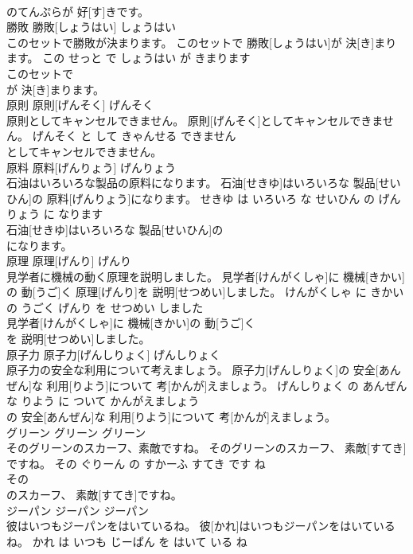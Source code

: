 \documentclass[8pt]{extreport}
\begin{document}
\begin{CJK}{UTF8}{min}
\\	のてんぷらが 好[す]きです。			
\\	勝敗	勝敗[しょうはい]	しょうはい	
\\	このセットで勝敗が決まります。	このセットで 勝敗[しょうはい]が 決[き]まります。	この せっと で しょうはい が きまります	
\\	このセットで
\\	が 決[き]まります。			
\\	原則	原則[げんそく]	げんそく	
\\	原則としてキャンセルできません。	原則[げんそく]としてキャンセルできません。	げんそく と して きゃんせる できません	
\\	としてキャンセルできません。			
\\	原料	原料[げんりょう]	げんりょう	
\\	石油はいろいろな製品の原料になります。	石油[せきゆ]はいろいろな 製品[せいひん]の 原料[げんりょう]になります。	せきゆ は いろいろ な せいひん の げんりょう に なります	
\\	石油[せきゆ]はいろいろな 製品[せいひん]の
\\	になります。			
\\	原理	原理[げんり]	げんり	
\\	見学者に機械の動く原理を説明しました。	見学者[けんがくしゃ]に 機械[きかい]の 動[うご]く 原理[げんり]を 説明[せつめい]しました。	けんがくしゃ に きかい の うごく げんり を せつめい しました	
\\	見学者[けんがくしゃ]に 機械[きかい]の 動[うご]く
\\	を 説明[せつめい]しました。			
\\	原子力	原子力[げんしりょく]	げんしりょく	
\\	原子力の安全な利用について考えましょう。	原子力[げんしりょく]の 安全[あんぜん]な 利用[りよう]について 考[かんが]えましょう。	げんしりょく の あんぜん な りよう に ついて かんがえましょう	
\\	の 安全[あんぜん]な 利用[りよう]について 考[かんが]えましょう。			
\\	グリーン	グリーン	グリーン	
\\	そのグリーンのスカーフ、素敵ですね。	そのグリーンのスカーフ、 素敵[すてき]ですね。	その ぐりーん の すかーふ すてき です ね	
\\	その
\\	のスカーフ、 素敵[すてき]ですね。			
\\	ジーパン	ジーパン	ジーパン	
\\	彼はいつもジーパンをはいているね。	彼[かれ]はいつもジーパンをはいているね。	かれ は いつも じーぱん を はいて いる ね	

\end{CJK}
\end{document}
